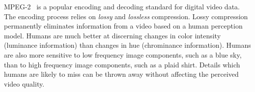 
MPEG-2~\cite{MPEG2} is a popular encoding and decoding standard for
digital video data. %
The encoding process relies on {\it lossy} and {\it lossless}
compression. Lossy compression permanently eliminates information from
a video based on a human perception model. Humans are much better at
discerning changes in color intensity (luminance information) than
changes in hue (chrominance information). Humans are also more
sensitive to low frequency image components, such as a blue sky, than
to high frequency image components, such as a plaid shirt. Details
which humans are likely to miss can be thrown away without affecting
the perceived video quality.




